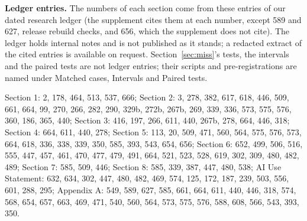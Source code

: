 \documentclass{article}
\begin{document}
\textbf{Ledger entries.} The numbers of each section come from these entries of our dated research ledger (the
supplement cites them at each number, except 589 and 627, release rebuild checks, and 656, which the supplement does not cite). The
ledger holds internal notes and is not published as it stands; a redacted extract of the cited entries is available on
request. Section~\ref{sec:miss}'s tests, the intervals and the paired tests are not ledger entries; their scripts and
pre-registrations are named under Matched cases, Intervals and Paired tests.
{\small Section 1: 2, 178, 464, 513, 537, 666; Section 2: 3, 278, 382, 617, 618, 446, 509, 661, 664, 99, 270, 266, 282, 290, 329b, 272b, 267b, 269, 339, 336, 573, 575, 576, 360, 186, 365, 440; Section 3: 416, 197, 266, 611, 440, 267b, 278, 664, 446, 318; Section 4: 664, 611, 440, 278; Section 5: 113, 20, 509, 471, 560, 564, 575, 576, 573, 664, 618, 336, 338, 339, 350, 585, 393, 543, 654, 656; Section 6: 652, 499, 506, 516, 555, 447, 457, 461, 470, 477, 479, 491, 664, 521, 523, 528, 619, 302, 309, 480, 482, 489; Section 7: 585, 509, 446; Section 8: 585, 339, 387, 447, 480, 538; AI Use Statement: 632, 634, 302, 447, 480, 482, 469, 574, 125, 172, 187, 239, 503, 556, 601, 288, 295; Appendix A: 549, 589, 627, 585, 661, 664, 611, 440, 446, 318, 574, 568, 654, 657, 663, 469, 471, 540, 560, 564, 573, 575, 576, 588, 608, 566, 543, 393, 350.\par}
\end{document}
